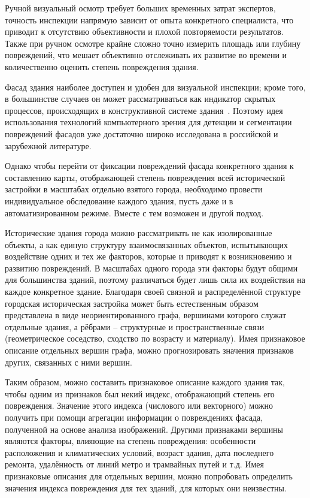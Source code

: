 \documentclass[14pt]{extarticle}
\begin{document}
Ручной визуальный осмотр требует больших временных затрат экспертов, точность
инспекции напрямую зависит от опыта конкретного специалиста, что приводит к
отсутствию объективности и плохой повторяемости результатов. Также при ручном
осмотре крайне сложно точно измерить площадь или глубину повреждений, что мешает
объективно отслеживать их развитие во времени и количественно оценить степень
повреждения здания.

Фасад здания наиболее доступен и удобен для визуальной инспекции; кроме того,
в большинстве случаев он может рассматриваться как индикатор скрытых процессов,
происходящих в конструктивной системе здания~\cite{gost31937,sp13102,spblaw820}.
Поэтому идея использования технологий компьютерного зрения для детекции и
сегментации повреждений фасадов уже достаточно широко исследована в российской
и зарубежной литературе.

Однако чтобы перейти от фиксации повреждений фасада конкретного здания к
составлению карты, отображающей степень повреждения всей исторической застройки
в масштабах отдельно взятого города, необходимо провести индивидуальное
обследование каждого здания, пусть даже и в автоматизированном режиме. Вместе
с тем возможен и другой подход.

Исторические здания города можно рассматривать не как изолированные объекты,
а как единую структуру взаимосвязанных объектов, испытывающих воздействие одних
и тех же факторов, которые и приводят к возникновению и развитию повреждений.
В масштабах одного города эти факторы будут общими для большинства зданий,
поэтому различаться будет лишь сила их воздействия на каждое конкретное здание.
Благодаря своей связной и распределённой структуре городская историческая
застройка может быть естественным образом представлена в виде неориентированного
графа, вершинами которого служат отдельные здания, а рёбрами -- структурные
и пространственные связи (геометрическое соседство, сходство по возрасту и
материалу). Имея признаковое описание отдельных вершин графа, можно прогнозировать
значения признаков других, связанных с ними вершин. 

Таким образом, можно составить признаковое описание каждого здания так, чтобы
одним из признаков был некий индекс, отображающий степень его повреждения.
Значение этого индекса (числового или векторного) можно получить при помощи
агрегации информации о повреждениях фасада, полученной на основе анализа
изображений. Другими признаками вершины являются факторы, влияющие на степень
повреждения: особенности расположения и климатических условий, возраст здания,
дата последнего ремонта, удалённость от линий метро и трамвайных путей и т.д.
Имея признаковые описания для отдельных вершин, можно попробовать определить
значения индекса повреждения для тех зданий, для которых они неизвестны.
\end{document}
